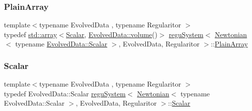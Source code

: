 \subsubsection{\texorpdfstring{Plain\+Array}{PlainArray}}
{\footnotesize\ttfamily template$<$typename Evolved\+Data , typename Regularitor $>$ \\
typedef \mbox{\hyperlink{classparticle_system_a1817956f802188c82c12c223c32bd28a}{std\+::array}}$<$\mbox{\hyperlink{classregu_system_3_01_newtonian_3_01typename_01_evolved_data_1_1_scalar_01_4_00_01_evolved_data_00_01_regularitor_01_4_a6993f135075541f441a7642845b183a5}{Scalar}}, \mbox{\hyperlink{classregu_system_a4260b237d36d137b01504c0effd385fa}{Evolved\+Data\+::volume}}()$>$ \mbox{\hyperlink{classregu_system}{regu\+System}}$<$ \mbox{\hyperlink{class_newtonian}{Newtonian}}$<$ typename \mbox{\hyperlink{classregu_system_aca8ee2c387943164ee3ea68370fc3ac0}{Evolved\+Data\+::\+Scalar}} $>$, Evolved\+Data, Regularitor $>$\+::\mbox{\hyperlink{classregu_system_3_01_newtonian_3_01typename_01_evolved_data_1_1_scalar_01_4_00_01_evolved_data_00_01_regularitor_01_4_a26da8a1ed92e5aced3615da524ef37b3}{Plain\+Array}}}

\mbox{\label{classregu_system_3_01_newtonian_3_01typename_01_evolved_data_1_1_scalar_01_4_00_01_evolved_data_00_01_regularitor_01_4_a6993f135075541f441a7642845b183a5}} 
\subsubsection{\texorpdfstring{Scalar}{Scalar}}
{\footnotesize\ttfamily template$<$typename Evolved\+Data , typename Regularitor $>$ \\
typedef Evolved\+Data\+::\+Scalar \mbox{\hyperlink{classregu_system}{regu\+System}}$<$ \mbox{\hyperlink{class_newtonian}{Newtonian}}$<$ typename Evolved\+Data\+::\+Scalar $>$, Evolved\+Data, Regularitor $>$\+::\mbox{\hyperlink{classregu_system_3_01_newtonian_3_01typename_01_evolved_data_1_1_scalar_01_4_00_01_evolved_data_00_01_regularitor_01_4_a6993f135075541f441a7642845b183a5}{Scalar}}}

